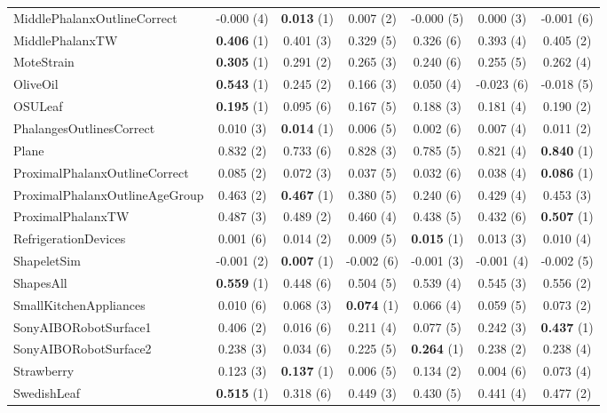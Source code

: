 \begin{table}[ht]
\begin{adjustbox}{width=\textwidth}
\begin{tabular}{lcccccc}
    MiddlePhalanxOutlineCorrect & -0.000 (4) & \textbf{0.013} (1) & 0.007 (2) & -0.000 (5) & 0.000 (3) & -0.001 (6) \\
    MiddlePhalanxTW & \textbf{0.406} (1) & 0.401 (3) & 0.329 (5) & 0.326 (6) & 0.393 (4) & 0.405 (2) \\
    MoteStrain & \textbf{0.305} (1) & 0.291 (2) & 0.265 (3) & 0.240 (6) & 0.255 (5) & 0.262 (4) \\
    OliveOil & \textbf{0.543} (1) & 0.245 (2) & 0.166 (3) & 0.050 (4) & -0.023 (6) & -0.018 (5) \\
    OSULeaf & \textbf{0.195} (1) & 0.095 (6) & 0.167 (5) & 0.188 (3) & 0.181 (4) & 0.190 (2) \\
    PhalangesOutlinesCorrect & 0.010 (3) & \textbf{0.014} (1) & 0.006 (5) & 0.002 (6) & 0.007 (4) & 0.011 (2) \\
    Plane & 0.832 (2) & 0.733 (6) & 0.828 (3) & 0.785 (5) & 0.821 (4) & \textbf{0.840} (1) \\
    ProximalPhalanxOutlineCorrect & 0.085 (2) & 0.072 (3) & 0.037 (5) & 0.032 (6) & 0.038 (4) & \textbf{0.086} (1) \\
    ProximalPhalanxOutlineAgeGroup & 0.463 (2) & \textbf{0.467} (1) & 0.380 (5) & 0.240 (6) & 0.429 (4) & 0.453 (3) \\
    ProximalPhalanxTW & 0.487 (3) & 0.489 (2) & 0.460 (4) & 0.438 (5) & 0.432 (6) & \textbf{0.507} (1) \\
    RefrigerationDevices & 0.001 (6) & 0.014 (2) & 0.009 (5) & \textbf{0.015} (1) & 0.013 (3) & 0.010 (4) \\
    ShapeletSim & -0.001 (2) & \textbf{0.007} (1) & -0.002 (6) & -0.001 (3) & -0.001 (4) & -0.002 (5) \\
    ShapesAll & \textbf{0.559} (1) & 0.448 (6) & 0.504 (5) & 0.539 (4) & 0.545 (3) & 0.556 (2) \\
    SmallKitchenAppliances & 0.010 (6) & 0.068 (3) & \textbf{0.074} (1) & 0.066 (4) & 0.059 (5) & 0.073 (2) \\
    SonyAIBORobotSurface1 & 0.406 (2) & 0.016 (6) & 0.211 (4) & 0.077 (5) & 0.242 (3) & \textbf{0.437} (1) \\
    SonyAIBORobotSurface2 & 0.238 (3) & 0.034 (6) & 0.225 (5) & \textbf{0.264} (1) & 0.238 (2) & 0.238 (4) \\
    Strawberry & 0.123 (3) & \textbf{0.137} (1) & 0.006 (5) & 0.134 (2) & 0.004 (6) & 0.073 (4) \\
    SwedishLeaf & \textbf{0.515} (1) & 0.318 (6) & 0.449 (3) & 0.430 (5) & 0.441 (4) & 0.477 (2) \\

\end{tabular}
\end{adjustbox}
\end{table}

